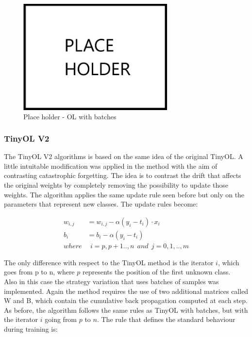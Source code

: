 \documentclass[12pt]{report}
\begin{document}
\begin{figure}[h!]
    \centering
    \includegraphics[width=0.7\textwidth]{Figures/Chapter3/PLACEHOLDER.jpg} 
    \caption{Place holder - OL with batches}
    \label{fig:block_diag_OLwb}    
\end{figure}

\subsubsection{TinyOL V2}
The TinyOL V2 algorithms is based on the same idea of the original TinyOL. A little intuitable modification was applied in the method with the aim of contrasting catastrophic forgetting. The idea is to contrast the drift that affects the original weights by completely removing the possibility to update those weights. The algorithm applies the same update rule seen before but only on the parameters that represent new classes. The update rules become:

\begin{align}
	w_{i,j} &= w_{i,j} - \alpha (y_i - t_i) \cdot x_i \\
    b_i     &= b_i - \alpha (y_i - t_i) \\
    where   & \: \: i= p,p+1..,n  \: \: and \: \:  j=0,1,..,m \nonumber  
\end{align}

The only difference with respect to the TinyOL method is the iterator $i$, which goes from p to n, where $p$ represents the position of the first unknown class. \\
Also in this case the strategy variation that uses batches of samples was implemented. Again the method requires the use of two additional matrices called W and B, which contain the cumulative back propagation computed at each step. As before, the algorithm follows the same rules as TinyOL with batches, but with the iterator $i$ going from $p$ to $n$. The rule that defines the standard behaviour during training is:
\end{document}
